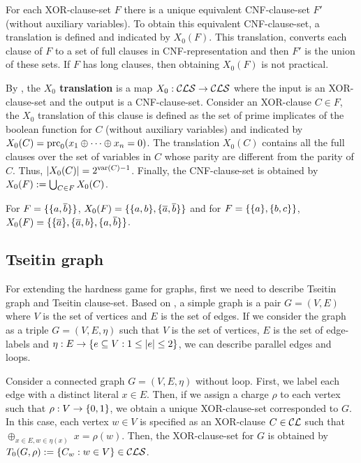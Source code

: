\documentclass{report}
\begin{document}
For each XOR-clause-set $F$ there is a unique equivalent CNF-clause-set $F'$ (without auxiliary variables). To obtain this equivalent CNF-clause-set, a translation is defined and indicated by $X_0(F)$. This translation, converts each clause of $F$ to a set of full clauses in CNF-representation and then $F'$ is the union of these sets. If $F$ has long clauses, then obtaining $X_0(F)$ is not practical.

\begin{defi}\label{def:x0tr}
By \cite{GwynneKullmann2013GoodRepresentationsIIex}, the \textbf{$X_0$ translation} is a map $X_0: \mathcal{CLS} \rightarrow \mathcal{CLS}$ where the input is an XOR-clause-set and the output is a  CNF-clause-set. Consider an XOR-clause $C \in F$, the $X_0$ translation of this clause is defined as the set of prime implicates of the boolean function for $C$ (without auxiliary variables) and indicated by $X_0(C)=\operatorname{prc}_0(x_1 \oplus \dots \oplus x_n = 0)$. The translation $X_0(C)$ contains all the full clauses over the set of variables in $C$ whose parity are different from the parity of $C$. Thus, $\lvert X_0(C) \rvert=2^{\operatorname{var}(C)-1}$. Finally, the CNF-clause-set is obtained by $X_0(F) := \bigcup_{C \in F} X_0(C)$.
\end{defi} 

\begin{examp}\label{exp:X0}
For $F=\{ \{ a,\overline b \} \}$, $X_0(F)= \{ \{ a,b \},\{ \overline a,\overline b \} \}$ and for $F=\{ \{ a \},\{ b,c \} \}$, $X_0(F)=\{ \{ \overline a \},\{ \overline a, b \}, \{ a, \overline b \} \}$.
\end{examp}
\subsection{Tseitin graph}
\label{sec:Tseitin graph}

For extending the hardness game for graphs, first we need to describe Tseitin graph and Tseitin clause-set. Based on \cite{GwynneKullmann2013GoodRepresentationsIIex}, a simple graph is a pair $G = (V,E)$ where $V$ is the set of vertices and $E$ is the set of edges. If we consider the graph as a triple $G = (V,E,\eta)$ such that $V$ is the set of vertices, $E$ is the set of edge-labels and $\eta: E \rightarrow \{ e \subseteq V : 1 \le \lvert e \rvert \le 2 \}$, we can describe parallel edges and loops. 

Consider a connected graph $G=(V,E,\eta)$ without loop. First, we label each edge with a distinct literal $x \in E$. Then, if we assign a charge $\rho$ to each vertex such that $\rho: V \rightarrow \{ 0,1 \}$, we obtain a unique XOR-clause-set corresponded to $G$. In this case, each vertex $w \in V$ is specified as an XOR-clause $C \in \mathcal{CL}$ such that $\oplus_{x \in E, w \in \eta(x)} \; x = \rho(w)$. Then, the XOR-clause-set for $G$ is obtained by $T_0(G,\rho) := \{ C_w : w \in V \} \in \mathcal{CLS}$. 
\end{document}
